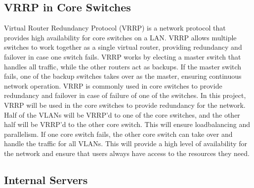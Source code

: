 \documentclass[12pt]{report}
\begin{document}
\subsection{VRRP in Core Switches}
Virtual Router Redundancy Protocol (VRRP) is a network protocol that provides high availability for core switches on a LAN. VRRP allows multiple switches to work together as a single virtual router, providing redundancy and failover in case one switch fails. VRRP works by electing a master switch that handles all traffic, while the other routers act as backups. If the master switch fails, one of the backup switches takes over as the master, ensuring continuous network operation. VRRP is commonly used in core switches to provide redundancy and failover in case of failure of one of the switches. In this project, VRRP will be used in the core switches to provide redundancy for the network. Half of the VLANs will be VRRP'd to one of the core switches, and the other half will be VRRP'd to the other core switch. This will ensure loadbalancing and parallelism. If one core switch fails, the other core switch can take over and handle the traffic for all VLANs. This will provide a high level of availability for the network and ensure that users always have access to the resources they need. \cite{VRRP}
\subsection{Internal Servers}
\end{document}
